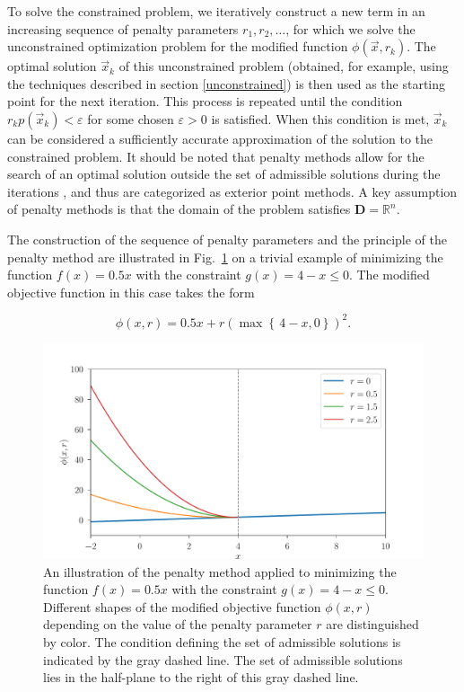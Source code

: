 To solve the constrained problem, we iteratively construct a new term in an increasing sequence of penalty parameters $ r_1, r_2, \dots$, for which we solve the unconstrained optimization problem for the modified function $ \phi (\vec{x}, r_k)$. The optimal solution $ \vec{x}_k $ of this unconstrained problem (obtained, for example, using the techniques described in section \ref{unconstrained}) is then used as the starting point for the next iteration. This process is repeated until the condition $ r_k p(\vec{x}_k) < \varepsilon$ for some chosen $ \varepsilon > 0$ is satisfied. When this condition is met, $ \vec{x}_k $ can be considered a sufficiently accurate approximation of the solution to the constrained problem. It should be noted that penalty methods allow for the search of an optimal solution outside the set of admissible solutions during the iterations \cite{non-linear-textbook}, and thus are categorized as exterior point methods. A key assumption of penalty methods is that the domain of the problem satisfies $ \mathbf{D} = \mathbb{R}^n $.

The construction of the sequence of penalty parameters and the principle of the penalty method are illustrated in Fig.~\ref{fig:penalty} on a trivial example of minimizing the function $ f(x) = 0.5x $ with the constraint $ g(x) = 4 - x \leq 0 $. The modified objective function in this case takes the form

\begin{equation}
	\phi (x, r) = 0.5x + r \left(\max  \left\{ \,  4-x, 0 \right\}\right)^2.
\end{equation}

\begin{figure}[H]
	\centering
	\includegraphics[width=1.0\textwidth]{figures/penalty.pdf}
	\vspace{0.25cm}
	\caption{An illustration of the penalty method applied to minimizing the function $ f(x) = 0.5x $ with the constraint $ g(x) = 4 - x \leq 0 $. Different shapes of the modified objective function $ \phi (x, r) $ depending on the value of the penalty parameter $ r $ are distinguished by color. The condition defining the set of admissible solutions is indicated by the gray dashed line. The set of admissible solutions lies in the half-plane to the right of this gray dashed line.}
	\label{fig:penalty}
\end{figure}


